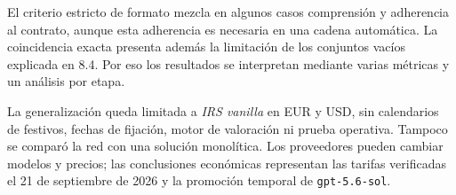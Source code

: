 El criterio estricto de formato mezcla en algunos casos comprensión y adherencia al contrato, aunque esta adherencia es necesaria en una cadena automática. La coincidencia exacta presenta además la limitación de los conjuntos vacíos explicada en 8.4. Por eso los resultados se interpretan mediante varias métricas y un análisis por etapa.

La generalización queda limitada a \textit{IRS vanilla} en EUR y USD, sin calendarios de festivos, fechas de fijación, motor de valoración ni prueba operativa. Tampoco se comparó la red con una solución monolítica. Los proveedores pueden cambiar modelos y precios; las conclusiones económicas representan las tarifas verificadas el 21 de septiembre de 2026 y la promoción temporal de \texttt{gpt-5.6-sol}.
